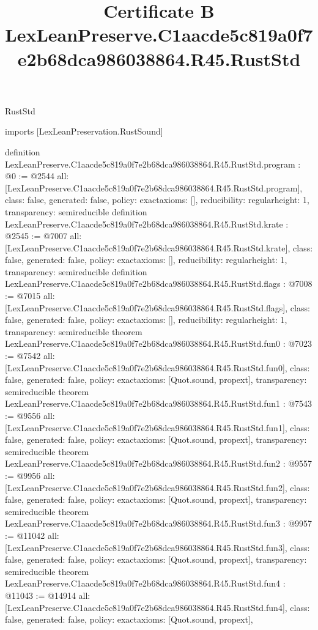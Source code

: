 \begin{lexlean}{RustStd}
\title{Certificate B LexLeanPreserve.C1aacde5c819a0f7e2b68dca986038864.R45.RustStd}
\begin{coremodule}
imports [LexLeanPreservation.RustSound]

definition LexLeanPreserve.C1aacde5c819a0f7e2b68dca986038864.R45.RustStd.program : @0 := @2544 {
  all: [LexLeanPreserve.C1aacde5c819a0f7e2b68dca986038864.R45.RustStd.program],
  class: false,
  generated: false,
  policy: exact{axioms: []},
  reducibility: regular{height: 1},
  transparency: semireducible
}
definition LexLeanPreserve.C1aacde5c819a0f7e2b68dca986038864.R45.RustStd.krate : @2545 := @7007 {
  all: [LexLeanPreserve.C1aacde5c819a0f7e2b68dca986038864.R45.RustStd.krate],
  class: false,
  generated: false,
  policy: exact{axioms: []},
  reducibility: regular{height: 1},
  transparency: semireducible
}
definition LexLeanPreserve.C1aacde5c819a0f7e2b68dca986038864.R45.RustStd.flags : @7008 := @7015 {
  all: [LexLeanPreserve.C1aacde5c819a0f7e2b68dca986038864.R45.RustStd.flags],
  class: false,
  generated: false,
  policy: exact{axioms: []},
  reducibility: regular{height: 1},
  transparency: semireducible
}
theorem LexLeanPreserve.C1aacde5c819a0f7e2b68dca986038864.R45.RustStd.fun0 : @7023 := @7542 {
  all: [LexLeanPreserve.C1aacde5c819a0f7e2b68dca986038864.R45.RustStd.fun0],
  class: false,
  generated: false,
  policy: exact{axioms: [Quot.sound, propext]},
  transparency: semireducible
}
theorem LexLeanPreserve.C1aacde5c819a0f7e2b68dca986038864.R45.RustStd.fun1 : @7543 := @9556 {
  all: [LexLeanPreserve.C1aacde5c819a0f7e2b68dca986038864.R45.RustStd.fun1],
  class: false,
  generated: false,
  policy: exact{axioms: [Quot.sound, propext]},
  transparency: semireducible
}
theorem LexLeanPreserve.C1aacde5c819a0f7e2b68dca986038864.R45.RustStd.fun2 : @9557 := @9956 {
  all: [LexLeanPreserve.C1aacde5c819a0f7e2b68dca986038864.R45.RustStd.fun2],
  class: false,
  generated: false,
  policy: exact{axioms: [Quot.sound, propext]},
  transparency: semireducible
}
theorem LexLeanPreserve.C1aacde5c819a0f7e2b68dca986038864.R45.RustStd.fun3 : @9957 := @11042 {
  all: [LexLeanPreserve.C1aacde5c819a0f7e2b68dca986038864.R45.RustStd.fun3],
  class: false,
  generated: false,
  policy: exact{axioms: [Quot.sound, propext]},
  transparency: semireducible
}
theorem LexLeanPreserve.C1aacde5c819a0f7e2b68dca986038864.R45.RustStd.fun4 : @11043 := @14914 {
  all: [LexLeanPreserve.C1aacde5c819a0f7e2b68dca986038864.R45.RustStd.fun4],
  class: false,
  generated: false,
  policy: exact{axioms: [Quot.sound, propext]},
}
\end{coremodule}
\end{lexlean}
